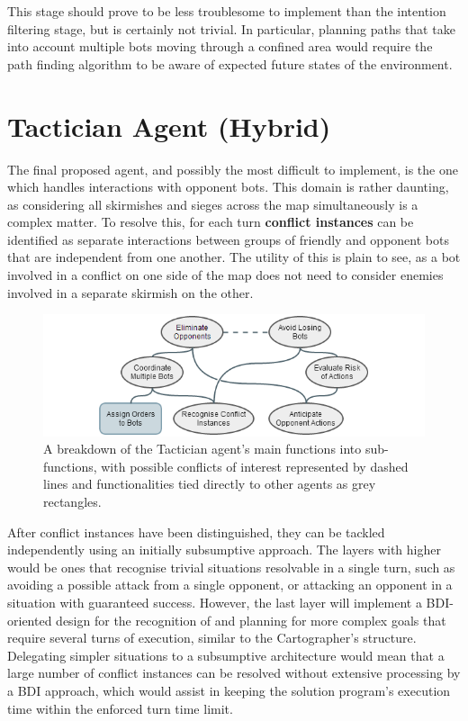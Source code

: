 \documentclass[a4paper,10pt]{article}
\begin{document}
This stage should prove to be less troublesome to implement than the intention filtering stage, but is certainly not trivial. In particular, planning paths that take into account multiple bots moving through a confined area would require the path finding algorithm to be aware of expected future states of the environment.

\section{Tactician Agent (Hybrid)}
The final proposed agent, and possibly the most difficult to implement, is the one which handles interactions with opponent bots. This domain is rather daunting, as considering all skirmishes and sieges across the map simultaneously is a complex matter. To resolve this, for each turn \textbf{conflict instances} can be identified as separate interactions between groups of friendly and opponent bots that are independent from one another. The utility of this is plain to see, as a bot involved in a conflict on one side of the map does not need to consider enemies involved in a separate skirmish on the other.

\begin{figure}[ht]
  \centering
  \includegraphics[width=0.8\linewidth]{tactician}
  \begin{minipage}[t]{0.8\textwidth}
    \caption{A breakdown of the Tactician agent's main functions into sub-functions, with possible conflicts of interest represented by dashed lines and functionalities tied directly to other agents as grey rectangles.}
  \end{minipage}
\end{figure}

After conflict instances have been distinguished, they can be tackled independently using an initially subsumptive approach. The layers with higher would be ones that recognise trivial situations resolvable in a single turn, such as avoiding a possible attack from a single opponent, or attacking an opponent in a situation with guaranteed success. However, the last layer will implement a BDI-oriented design for the recognition of and planning for more complex goals that require several turns of execution, similar to the Cartographer's structure. Delegating simpler situations to a subsumptive architecture would mean that a large number of conflict instances can be resolved without extensive processing by a BDI approach, which would assist in keeping the solution program's execution time within the enforced turn time limit.
\end{document}
